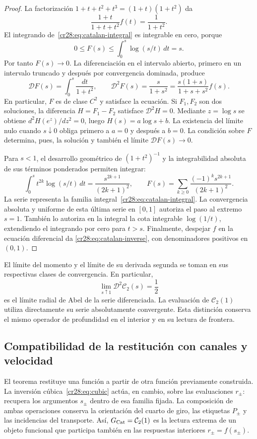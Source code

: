 \begin{proof}
La factorización $1+t+t^2+t^3=(1+t)(1+t^2)$ da
\[
 \frac{1+t}{1+t+t^2}f(t)=\frac1{1+t^2}.
\]
El integrando de~\eqref{cr28:eq:catalan-integral} es
integrable en cero, porque
\[
 0\leq F(s)\leq\int_0^s\log(s/t)\,dt=s.
\]
Por tanto $F(s)\to0$. La diferenciación en el intervalo abierto,
primero en un intervalo truncado y después por convergencia dominada,
produce
\[
 \mathcal DF(s)=\int_0^s\frac{dt}{1+t^2},
 \qquad \mathcal D^2F(s)=\frac{s}{1+s^2}
     =\frac{s(1+s)}{1+s+s^2}f(s).
\]
En particular, $F$ es de clase $C^2$ y satisface la ecuación.
Si $F_1,F_2$ son dos soluciones, la diferencia $H=F_1-F_2$
satisface $\mathcal D^2H=0$. Mediante $z=\log s$ se obtiene
$d^2H(e^z)/dz^2=0$, luego $H(s)=a\log s+b$.
La existencia del límite nulo cuando $s\downarrow0$ obliga primero
a $a=0$ y después a $b=0$. La condición sobre $F$ determina, pues,
la solución y también el límite $\mathcal DF(s)\to0$.

Para $s<1$, el desarrollo geométrico de $(1+t^2)^{-1}$ y la
integrabilidad absoluta de sus términos ponderados permiten integrar:
\[
 \int_0^s t^{2k}\log(s/t)\,dt
     =\frac{s^{2k+1}}{(2k+1)^2},\qquad
 F(s)=\sum_{k\geq0}\frac{(-1)^ks^{2k+1}}{(2k+1)^2}.
\]
La serie representa la familia integral~\eqref{cr28:eq:catalan-integral}. La convergencia
absoluta y uniforme de esta última serie en $[0,1]$ autoriza el
paso al extremo $s=1$. También lo autoriza en la integral la cota
integrable $\log(1/t)$, extendiendo el integrando por cero para
$t>s$. Finalmente, despejar $f$ en la ecuación diferencial da
\eqref{cr28:eq:catalan-inverse}, con denominadores
positivos en $(0,1)$.
\end{proof}

El límite del momento y el límite de su derivada segunda se toman
en sus respectivas clases de convergencia. En particular,
\[
 \lim_{s\uparrow1}\mathcal D^2\mathcal C_2(s)=\frac12
\]
es el límite radial de Abel de la serie diferenciada. La evaluación
de $\mathcal C_2(1)$ utiliza directamente su serie absolutamente
convergente. Esta distinción conserva el mismo operador de profundidad
en el interior y en su lectura de frontera.

\subsection{Compatibilidad de la restitución con canales y velocidad}
\label{cr28:sec:channels-velocity}

El teorema restituye una función a partir de otra función previamente
construida. La inversión cúbica~\eqref{cr28:eq:cubic} actúa, en cambio,
sobre las evaluaciones $r_\pm$: recupera los argumentos $s_\pm$
dentro de esa familia fijada. La composición de ambas operaciones
conserva la orientación del cuarto de giro, las etiquetas $P_\pm$
y las incidencias del transporte. Así, $G_{\rm Cat}=\mathcal C_2(1)$
es la lectura extrema de un objeto funcional que participa también
en las respuestas interiores $r_\pm=f(s_\pm)$.

